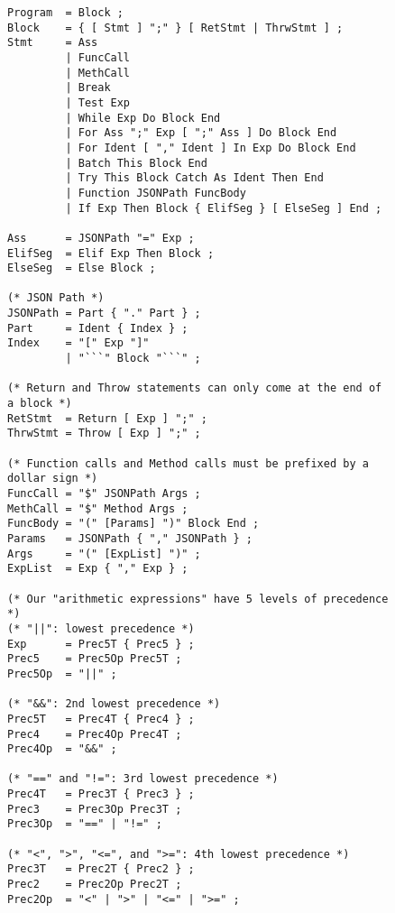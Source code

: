 \begin{figure}[H]\ContinuedFloat
    \begin{verbatim}
Program  = Block ;
Block    = { [ Stmt ] ";" } [ RetStmt | ThrwStmt ] ;
Stmt     = Ass
         | FuncCall
         | MethCall
         | Break
         | Test Exp
         | While Exp Do Block End
         | For Ass ";" Exp [ ";" Ass ] Do Block End
         | For Ident [ "," Ident ] In Exp Do Block End
         | Batch This Block End
         | Try This Block Catch As Ident Then End
         | Function JSONPath FuncBody
         | If Exp Then Block { ElifSeg } [ ElseSeg ] End ;

Ass      = JSONPath "=" Exp ;
ElifSeg  = Elif Exp Then Block ;
ElseSeg  = Else Block ;

(* JSON Path *)
JSONPath = Part { "." Part } ;
Part     = Ident { Index } ;
Index    = "[" Exp "]"
         | "```" Block "```" ;

(* Return and Throw statements can only come at the end of a block *)
RetStmt  = Return [ Exp ] ";" ;
ThrwStmt = Throw [ Exp ] ";" ;

(* Function calls and Method calls must be prefixed by a dollar sign *)
FuncCall = "$" JSONPath Args ;
MethCall = "$" Method Args ;
FuncBody = "(" [Params] ")" Block End ;
Params   = JSONPath { "," JSONPath } ;
Args     = "(" [ExpList] ")" ;
ExpList  = Exp { "," Exp } ;

(* Our "arithmetic expressions" have 5 levels of precedence *)
(* "||": lowest precedence *)
Exp      = Prec5T { Prec5 } ;
Prec5    = Prec5Op Prec5T ;
Prec5Op  = "||" ;

(* "&&": 2nd lowest precedence *)
Prec5T   = Prec4T { Prec4 } ;
Prec4    = Prec4Op Prec4T ;
Prec4Op  = "&&" ;

(* "==" and "!=": 3rd lowest precedence *)
Prec4T   = Prec3T { Prec3 } ;
Prec3    = Prec3Op Prec3T ;
Prec3Op  = "==" | "!=" ;

(* "<", ">", "<=", and ">=": 4th lowest precedence *)
Prec3T   = Prec2T { Prec2 } ;
Prec2    = Prec2Op Prec2T ;
Prec2Op  = "<" | ">" | "<=" | ">=" ;
    \end{verbatim}
\end{figure}

